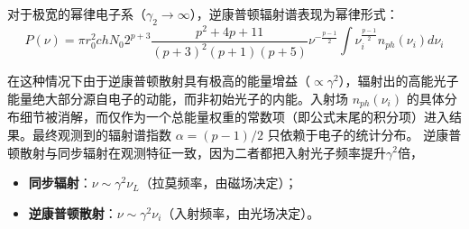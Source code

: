 \begin{tcolorbox}[colframe=black, colback=white, boxrule=0.5pt, arc=0pt]
对于极宽的幂律电子系（$\gamma_2 \to \infty$），逆康普顿辐射谱表现为幂律形式：
\begin{equation}
    P(\nu) = \pi r_0^2 ch N_0 2^{p+3} \frac{p^2+4p+11}{(p+3)^2(p+1)(p+5)} \nu^{-\frac{p-1}{2}} \int \nu_i^{\frac{p-1}{2}} n_{ph}(\nu_i) d\nu_i
\end{equation}
\end{tcolorbox}

在这种情况下由于逆康普顿散射具有极高的能量增益（$\propto \gamma^2$），辐射出的高能光子能量绝大部分源自电子的动能，而非初始光子的内能。入射场 $n_{ph}(\nu_i)$ 的具体分布细节被消解，而仅作为一个总能量权重的常数项（即公式末尾的积分项）进入结果。最终观测到的辐射谱指数 $\alpha = (p-1)/2$ 只依赖于电子的统计分布。
逆康普顿散射与同步辐射在观测特征一致，因为二者都把入射光子频率提升$\gamma^2$倍，
\begin{itemize}
    \item \textbf{同步辐射}：$\nu \sim \gamma^2 \nu_L$（拉莫频率，由磁场决定）；
    \item \textbf{逆康普顿散射}：$\nu \sim \gamma^2 \nu_i$（入射频率，由光场决定）。
\end{itemize}

